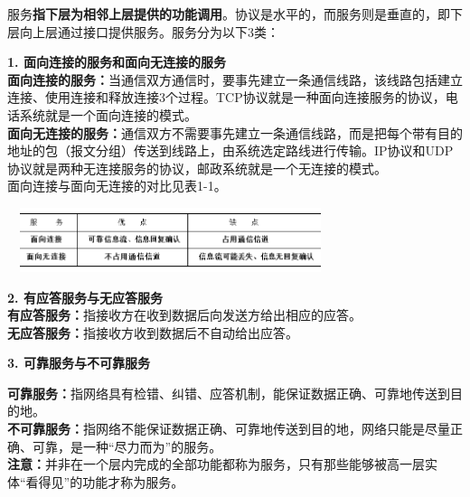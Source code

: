 {{服务\textbf{指下层为相邻上层提供的功能调用}}{。}}协议是水平的，而服务则是垂直的，即下层向上层通过接口提供服务。服务分为以下3类：

\textbf{{1. 面向连接}{的服务和面向无连接的服务}}\\

{{\textbf{面向连接的服务}}\textbf{{：}}}当通信双方通信时，要事先建立一条通信线路，该线路包括建立连接、使用连接和释放连接3个过程。TCP协议就是一种面向连接服务的协议，电话系统就是一个面向连接的模式。\\
{\textbf{面向无连接的服务：}}通信双方不需要事先建立一条通信线路，而是把每个带有目的地址的包（报文分组）传送到线路上，由系统选定路线进行传输。IP协议和UDP协议就是两种无连接服务的协议，邮政系统就是一个无连接的模式。\\
面向连接与面向无连接的对比见表1-1。

~~\includegraphics[width=3.46875in,height=0.73958in]{png-jpeg-pics/A29E1A87A8661A89CCCAC4686C76F18A.png}

\textbf{{2. 有应答服务与无应答服务}}\\

\textbf{有应答服务：}指接收方在收到数据后向发送方给出相应的应答。\\
\textbf{无应答服务：}指接收方收到数据后不自动给出应答。

\textbf{{3. 可靠服务与不可靠服务}}

{\textbf{可靠服务：}}指网络具有检错、纠错、应答机制，能保证数据正确、可靠地传送到目的地。\\
{\textbf{不可靠服务：}}指网络不能保证数据正确、可靠地传送到目的地，网络只能是尽量正确、可靠，是一种``尽力而为''的服务。\\

{\textbf{{注意：}}并非在一个层内完成的全部功能都称为服务，只有那些能够被高一层实体``看得见''的功能才称为服务。}
